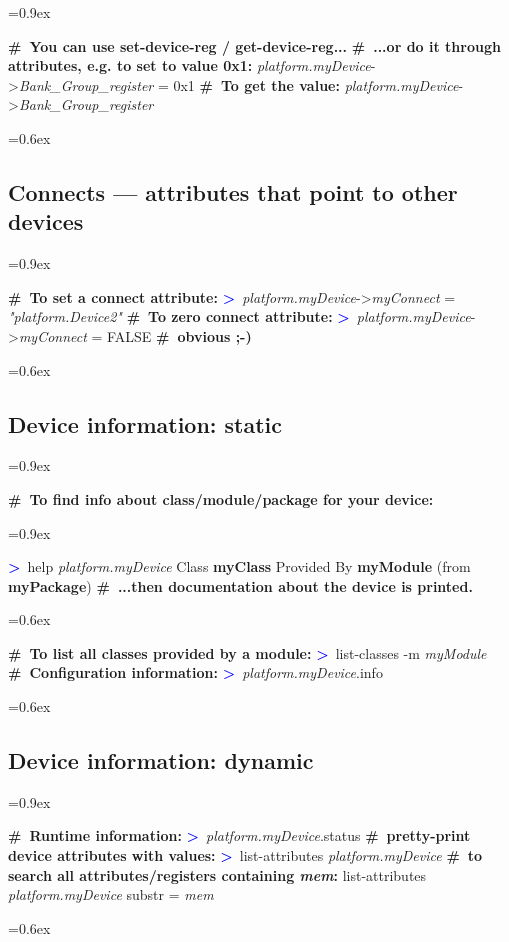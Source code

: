 \documentclass[8pt]{extarticle}
\newenvironment{code}[1][]{%
\begin{prebox}[#1]\obeylines%
\fontdimen2\font=0.9ex%
}{%
\end{prebox}%
\fontdimen2\font=0.6ex%
}
\newcommand{\ind}{\hphantom{~~~}}
\newcommand{\sprompt}{\textcolor{blue}{\textbf{>}\ }}
\newcommand{\cmtcommon}[1]{\textcolor{Sepia}{\textbf{#1}}}
\newcommand{\cmt}[1]{\cmtcommon{\#\ #1}}
\newcommand{\p}[1]{\textit{\large#1}}
\begin{document}
\begin{multicols*}{3}
\begin{code}
    \cmt{You can use set-device-reg / get-device-reg...}
    \cmt{...or do it through attributes, e.g. to set to value 0x1:}
    \p{platform.myDevice}->\p{Bank_Group_register} = 0x1
    \cmt{To get the value:}
    \p{platform.myDevice}->\p{Bank_Group_register}
\end{code}

\subsection{Connects — attributes that point to other devices}

\begin{code}
    \cmt{To set a connect attribute:}
    \sprompt \p{platform.myDevice}->\p{myConnect} = \p{"platform.Device2"}
    \cmt{To zero connect attribute:}
    \sprompt \p{platform.myDevice}->\p{myConnect} = FALSE \ind\cmt{obvious ;-)}
\end{code}

\subsection{Device information: static}

\begin{code}
    \cmt{To find info about class/module/package for your device:}
    \begin{code}
    \sprompt help \p{platform.myDevice}
    \ind Class \textbf{myClass}
    \vspace{0.3em} \ind Provided By
    \ind \ind   \textbf{myModule} (from \textbf{myPackage})
    \vspace{0.2em}
    \ind \cmt{...then documentation about the device is printed.}
    \end{code}
    \vspace{0.3em}

    \cmt{To list all classes provided by a module:}
    \sprompt list-classes -m \p{myModule}
    \cmt{Configuration information:}
    \sprompt \p{platform.myDevice}.info
\end{code}

\subsection{Device information: dynamic}

\begin{code}
    \cmt{Runtime information:}
    \sprompt \p{platform.myDevice}.status
    \cmt{pretty-print device attributes with values:}
    \sprompt list-attributes \p{platform.myDevice}
    \cmt{to search all attributes/registers containing \p{mem}:}
    list-attributes \p{platform.myDevice} substr = \p{mem}
\end{code}



\end{multicols*}
\end{document}
